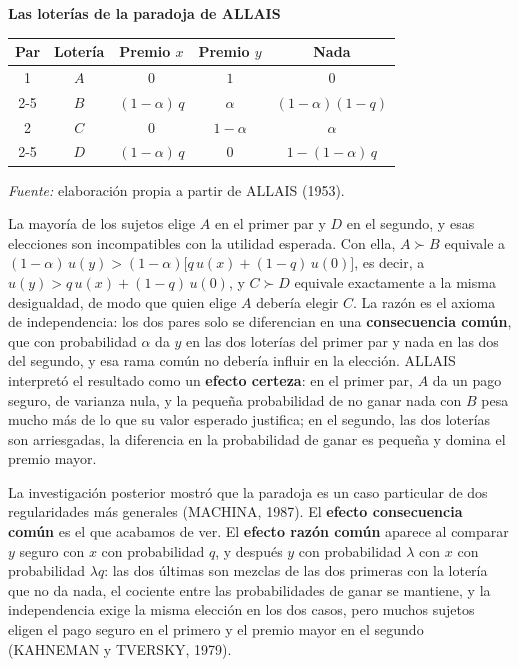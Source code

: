 \documentclass[10pt,a4paper]{article}
\begin{document}
\begin{center}\begin{minipage}{\linewidth}\centering
{\small\textbf{Las loterías de la paradoja de ALLAIS}}\par\vspace{0.3em}
{\footnotesize\renewcommand{\arraystretch}{1.4}%
\begin{tabular}{|c|c|c|c|c|}
\hline
\textbf{Par} & \textbf{Lotería} & \textbf{Premio $x$} & \textbf{Premio $y$} & \textbf{Nada} \tabularnewline\hline
1 & $A$ & $0$ & $1$ & $0$ \tabularnewline\cline{2-5}
  & $B$ & $(1-\alpha)\,q$ & $\alpha$ & $(1-\alpha)(1-q)$ \tabularnewline\hline
2 & $C$ & $0$ & $1-\alpha$ & $\alpha$ \tabularnewline\cline{2-5}
  & $D$ & $(1-\alpha)\,q$ & $0$ & $1-(1-\alpha)\,q$ \tabularnewline\hline
\end{tabular}}\par\vspace{0.3em}
{\small\textit{Fuente: }elaboración propia a partir de ALLAIS (1953).}
\end{minipage}\end{center}

La mayoría de los sujetos elige $A$ en el primer par y $D$ en el segundo, y esas elecciones son incompatibles con la utilidad esperada. Con ella, $A\succ B$ equivale a $(1-\alpha)\,u(y)>(1-\alpha)\big[q\,u(x)+(1-q)\,u(0)\big]$, es decir, a $u(y)>q\,u(x)+(1-q)\,u(0)$, y $C\succ D$ equivale exactamente a la misma desigualdad, de modo que quien elige $A$ debería elegir $C$. La razón es el axioma de independencia: los dos pares solo se diferencian en una \textbf{consecuencia común}, que con probabilidad $\alpha$ da $y$ en las dos loterías del primer par y nada en las dos del segundo, y esa rama común no debería influir en la elección. ALLAIS interpretó el resultado como un \textbf{efecto certeza}: en el primer par, $A$ da un pago seguro, de varianza nula, y la pequeña probabilidad de no ganar nada con $B$ pesa mucho más de lo que su valor esperado justifica; en el segundo, las dos loterías son arriesgadas, la diferencia en la probabilidad de ganar es pequeña y domina el premio mayor.

La investigación posterior mostró que la paradoja es un caso particular de dos regularidades más generales (MACHINA, 1987). El \textbf{efecto consecuencia común} es el que acabamos de ver. El \textbf{efecto razón común} aparece al comparar $y$ seguro con $x$ con probabilidad $q$, y después $y$ con probabilidad $\lambda$ con $x$ con probabilidad $\lambda q$: las dos últimas son mezclas de las dos primeras con la lotería que no da nada, el cociente entre las probabilidades de ganar se mantiene, y la independencia exige la misma elección en los dos casos, pero muchos sujetos eligen el pago seguro en el primero y el premio mayor en el segundo (KAHNEMAN y TVERSKY, 1979).
\end{document}
